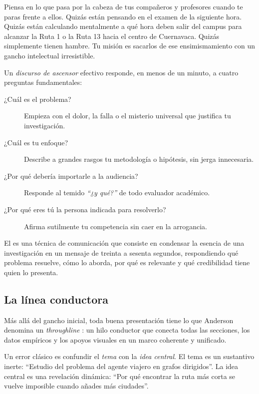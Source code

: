 Piensa en lo que pasa por la cabeza de tus compañeros y profesores cuando te paras frente a ellos.
Quizás están pensando en el examen de la siguiente hora.
Quizás están calculando mentalmente a qué hora deben salir del campus para alcanzar la Ruta 1 o la Ruta 13 hacia el centro de Cuernavaca.
Quizás simplemente tienen hambre.
Tu misión es sacarlos de ese ensimismamiento con un gancho intelectual irresistible.

Un \emph{discurso de ascensor} efectivo responde, en menos de un minuto, a cuatro preguntas fundamentales:

\begin{description}
	\item[¿Cuál es el problema?] Empieza con el dolor, la falla o el misterio universal que justifica tu investigación.
	\item[¿Cuál es tu enfoque?] Describe a grandes rasgos tu metodología o hipótesis, sin jerga innecesaria.
	\item[¿Por qué debería importarle a la audiencia?] Responde al temido \emph{“¿y qué?”} de todo evaluador académico.
	\item[¿Por qué eres tú la persona indicada para resolverlo?] Afirma sutilmente tu competencia sin caer en la arrogancia.
\end{description}

\begin{remember}
	\label{rem:elevatorpitch}
	El  es una técnica de comunicación que consiste en condensar la esencia de una investigación en un mensaje de treinta a sesenta segundos, respondiendo qué problema resuelve, cómo lo aborda, por qué es relevante y qué credibilidad tiene quien lo presenta.
\end{remember}

\subsection*{La línea conductora}

Más allá del gancho inicial, toda buena presentación tiene lo que Anderson denomina un \emph{throughline} \cite{Anderson2016}: un hilo conductor que conecta todas las secciones, los datos empíricos y los apoyos visuales en un marco coherente y unificado.

Un error clásico es confundir el \emph{tema} con la \emph{idea central}.
El tema es un sustantivo inerte: “Estudio del problema del agente viajero en grafos dirigidos”.
La idea central es una revelación dinámica: “Por qué encontrar la ruta más corta se vuelve imposible cuando añades más ciudades”.


